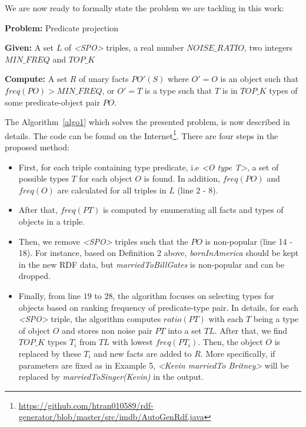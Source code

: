 \documentclass{acm_proc_article-sp}
\begin{document}
We are now ready to formally state the problem we are tackling in this work:

\begin{framed}
\textbf{Problem:} Predicate projection

\textbf{Given:} A set $L$ of \textit{<SPO>} triples, a real number $NOISE\_RATIO$, two integers $MIN\_FREQ$ and $TOP\_K$

\textbf{Compute:} A set $R$ of unary facts $PO'(S)$ where $O' = O$ is an object such that $freq(PO) > MIN\_FREQ$, or $O' = T$ is a type such that $T$ is in $TOP\_K$ types of some predicate-object pair $PO$.
\end{framed}

The Algorithm~\ref{algo1} which solves the presented problem, is now described in details. The code can be found on the Internet\footnote{\url{https://github.com/htran010589/rdf-generator/blob/master/src/imdb/AutoGenRdf.java}}. There are four steps in the proposed method:
\begin{itemize}
\item First, for each triple containing type predicate, i.e \textit{<O type T>}, a set of possible types $T$ for each object $O$ is found. In addition, $freq(PO)$ and $freq(O)$ are calculated for all triples in $L$ (line 2 - 8).
\item After that, $freq(PT)$ is computed by enumerating all facts and types of objects in a triple.
\item Then, we remove \textit{<SPO>} triples such that the $PO$ is non-popular (line 14 - 18). For instance, based on Definition 2 above, \textit{bornInAmerica} should be kept in the new RDF data, but \textit{marriedToBillGates} is non-popular and can be dropped.
\item Finally, from line $19$ to $28$, the algorithm focuses on selecting types for objects based on ranking frequency of predicate-type pair. In details, for each \textit{<SPO>} triple, the algorithm computes $ratio(PT)$ with each $T$ being a type of object $O$ and stores non noise pair $PT$ into a set $TL$. After that, we find $TOP\_K$ types $T_{i}$ from $TL$ with lowest $freq(PT_{i})$. Then, the object $O$ is replaced by these $T_{i}$ and new facts are added to $R$. More specifically, if parameters are fixed as in Example 5, \textit{<Kevin marriedTo Britney>} will be replaced by \textit{marriedToSinger(Kevin)} in the output.
\end{itemize}
\end{document}
